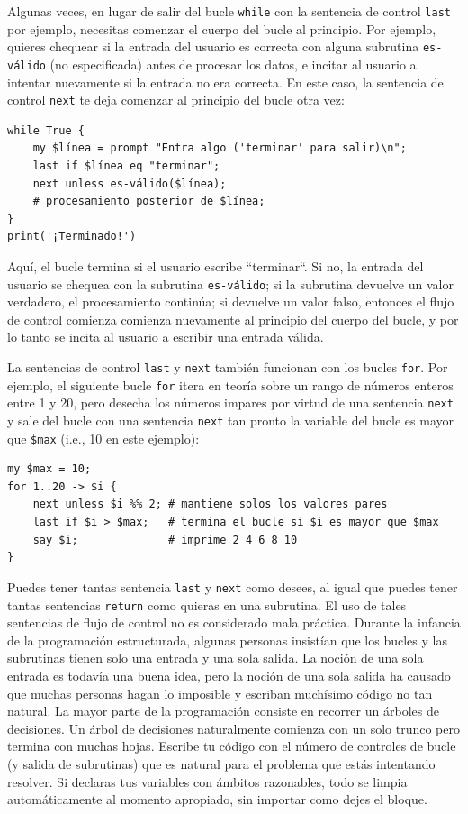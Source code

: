 Algunas veces, en lugar de salir del bucle {\tt while} con la 
sentencia de control {\tt last} por ejemplo, necesitas comenzar
el cuerpo del bucle al principio. Por ejemplo, quieres
chequear si la entrada del usuario es correcta con alguna
subrutina {\tt es-válido} (no especificada) antes de procesar los datos,
e incitar al usuario a intentar nuevamente si la entrada 
no era correcta. En este caso, la sentencia de control {\tt next}
te deja comenzar al principio del bucle otra vez:

\begin{lstlisting}
while True {
    my $línea = prompt "Entra algo ('terminar' para salir)\n";
    last if $línea eq "terminar";
    next unless es-válido($línea);
    # procesamiento posterior de $línea;
}
print('¡Terminado!')
\end{lstlisting}
%
Aquí, el bucle termina si el usuario escribe ``terminar``. Si no,
la entrada del usuario se chequea con la subrutina {\tt es-válido};
si la subrutina devuelve un valor verdadero, el procesamiento 
continúa; si devuelve un valor falso, entonces el flujo de control 
comienza comienza nuevamente al principio del cuerpo del bucle,
y por lo tanto se incita al usuario a escribir una entrada válida.

La sentencias de control {\tt last} y {\tt next} también funcionan
con los bucles {\tt for}. Por ejemplo, el siguiente bucle {\tt for}
itera en teoría sobre un rango de números enteros entre 1 y 20,
pero desecha los números impares por virtud de una sentencia {\tt next}
y sale del bucle con una sentencia {\tt next} tan pronto la variable del
bucle es mayor que {\tt \$max} (i.e., 10 en este ejemplo):

\begin{lstlisting}
my $max = 10;
for 1..20 -> $i {
    next unless $i %% 2; # mantiene solos los valores pares
    last if $i > $max;   # termina el bucle si $i es mayor que $max
    say $i;              # imprime 2 4 6 8 10
}
\end{lstlisting}

Puedes tener tantas sentencia {\tt last} y {\tt next} como desees,
al igual que puedes tener tantas sentencias {\tt return} como quieras
en una subrutina. El uso de tales sentencias de flujo de control no
es considerado mala práctica. Durante la infancia de la programación 
estructurada, algunas personas insistían que los bucles y las subrutinas
tienen solo una entrada y una sola salida. La noción de una sola entrada
es todavía una buena idea, pero la noción de una sola salida ha causado que 
muchas personas hagan lo imposible y escriban muchísimo código no tan natural.
La mayor parte de la programación consiste en recorrer un árboles de
decisiones. Un árbol de decisiones naturalmente comienza con un solo trunco 
pero termina con muchas hojas. Escribe tu código con el número de 
controles de bucle (y salida de subrutinas) que es natural para el 
problema que estás intentando resolver. Si declaras tus variables con ámbitos
razonables, todo se limpia automáticamente al momento apropiado, sin importar
como dejes el bloque.

